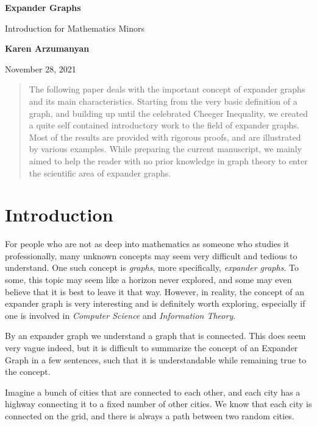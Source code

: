 \documentclass{article}
\theoremstyle{theorem}
\theoremstyle{definition}
\theoremstyle{example}
\theoremstyle{proposition}
\begin{document}
    \begin{center}
        \Large
        \textbf{Expander Graphs}

        \vspace{0.4cm}
        \large
        Introduction for Mathematics Minors
        
        \vspace{0.4cm}
        \textbf{Karen Arzumanyan}

        \vspace{0.2cm}
        November 28, 2021

    \end{center}

    \begin{abstract}
        The following paper deals with the important concept of expander graphs and its main characteristics. Starting from the very basic definition of a graph, and building up until the celebrated Cheeger Inequality, we created a quite self contained introductory work to the field of expander graphs. Most of the results are provided with rigorous proofs, and are illustrated by various examples. While preparing the current manuscript, we mainly aimed to help the reader with no prior knowledge in graph theory to enter the scientific area of expander graphs.
    \end{abstract}

    \section{Introduction}
        For people who are not as deep into mathematics as someone who studies it professionally, many unknown concepts may seem very difficult and tedious to understand. One such concept is \textit{graphs}, more specifically, \textit{expander graphs}. To some, this topic may seem like a horizon never explored, and some may even believe that it is best to leave it that way. However, in reality, the concept of an expander graph is very interesting and is definitely worth exploring, especially if one is involved in \textit{Computer Science }and \textit{Information Theory}.

    By an expander graph we understand a graph that is connected. This does seem very vague indeed, but it is difficult to summarize the concept of an Expander Graph in a few sentences, such that it is understandable while remaining true to the concept.

    Imagine a bunch of cities that are connected to each other, and each city has a highway connecting it to a fixed number of other cities. We know that each city is connected on the grid, and there is always a path between two random cities.
\end{document}
